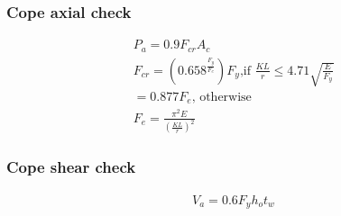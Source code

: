 \subsubsection{Cope axial check}
\begin{gather}
    P_a = 0.9 F_{cr} A_c \\
    F_{cr} = (0.658 ^ \frac{F_y}{F_e})F_y \text{,if } \frac{KL}{r} \le 4.71 \sqrt{\frac{E}{F_y}}\\
    = 0.877 F_e \text{, otherwise} \\
    F_e = \frac{\pi^2 E}{(\frac{KL}{r})^2}
\end{gather}
\subsubsection{Cope shear check}
\begin{gather}
    V_a = 0.6 F_y h_o t_w
\end{gather}








